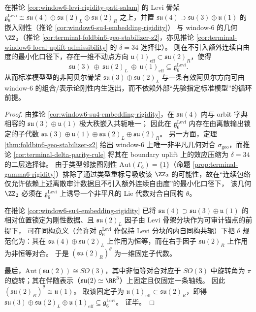 \begin{corollary}\label{cor:window6-levi-rigidity-sm-residual}
在推论 \ref{cor:window6-levi-rigidity-pati-salam} 的 Levi 骨架
\(
\mathfrak g^{\mathrm{Levi}}_6\cong \mathfrak{su}(4)\oplus\mathfrak{su}(2)_L\oplus\mathfrak{su}(2)_R
\)
之上，并置 \(\mathfrak{su}(4)\supset \mathfrak{su}(3)\oplus\mathfrak u(1)\) 的嵌入刚性（推论 \ref{cor:window6-su4-embedding-rigidity}）
与 window-\(6\) 的几何 \(\ZZ_2\)（推论 \ref{cor:terminal-foldbin6-geo-stabilizer-z2}，亦见推论 \ref{cor:terminal-window6-local-uplift-admissibility} 的 \(\delta=34\) 选择律）。
则在不引入额外连续自由度的最小化口径下，存在一维不动点方向 \(\mathfrak u(1)_{\mathrm{eff}}\subset \mathfrak{su}(2)_R\)，使得
\[
\mathfrak{su}(3)\ \oplus\ \mathfrak{su}(2)_L\ \oplus\ \mathfrak u(1)_{\mathrm{eff}}
\subseteq \mathfrak g^{\mathrm{Levi}}_6.
\]
从而标准模型型的非阿贝尔骨架 \(\mathfrak{su}(3)\oplus\mathfrak{su}(2)_L\) 与一条有效阿贝尔方向可由 window-\(6\) 的组合/表示论刚性内生选出，而不依赖外部“先验指定标准模型”的循环前提。
\end{corollary}
\begin{proof}
由推论 \ref{cor:window6-su4-embedding-rigidity}，在 \(\mathfrak{su}(4)\) 内与 orbit 字典相容的 \(\mathfrak{su}(3)\oplus\mathfrak u(1)\) 极大秩嵌入共轭唯一；
因此在 \(\mathfrak g^{\mathrm{Levi}}_6\) 内存在由离散输出锁定的子代数
\(
\mathfrak{su}(3)\oplus\mathfrak u(1)\oplus\mathfrak{su}(2)_L\oplus\mathfrak{su}(2)_R
\)。
另一方面，定理 \ref{thm:foldbin6-geo-stabilizer-z2} 给出 window-\(6\) 上唯一非平凡几何对合 \(\sigma_{\mathrm{geo}}\)，而推论 \ref{cor:terminal-delta-parity-rule} 将其在 boundary uplift 上的效应压缩为 \(\delta=34\) 的二层选择律。
由于类型邻接图刚性 \(\mathrm{Aut}(\Gamma_6)=\{1\}\)（命题 \ref{prop:terminal-gamma6-rigidity}）排除了通过类型重标号吸收该 \(\ZZ_2\) 的可能性，故在“连续包络仅允许依赖上述离散审计数据且不引入额外连续自由度”的最小化口径下，
该几何 \(\ZZ_2\) 必须在 \(\mathfrak g^{\mathrm{Levi}}_6\) 上诱导一个非平凡的 Lie 代数对合自同构 \(\theta\)。
\par
在推论 \ref{cor:window6-su4-embedding-rigidity} 已将 \(\mathfrak{su}(4)\supset \mathfrak{su}(3)\oplus\mathfrak u(1)\) 的相对位置锁定为刚性数据、且 \(\mathfrak{su}(2)_L\) 因子由 Levi 骨架分块作为可审计锚点的前提下，
可在同构意义（允许对 \(\mathfrak g^{\mathrm{Levi}}_6\) 作保持 Levi 分块的内自同构共轭）下把 \(\theta\) 规范化为：其在 \(\mathfrak{su}(4)\oplus\mathfrak{su}(2)_L\) 上作用为恒等，而在右手因子 \(\mathfrak{su}(2)_R\) 上作用为非恒等对合。
于是 \((\mathfrak{su}(2)_R)^{\theta}\) 为一维固定子代数。
\par
最后，\(\mathrm{Aut}(\mathfrak{su}(2))\cong SO(3)\)，其中非恒等对合对应于 \(SO(3)\) 中旋转角为 \(\pi\) 的旋转；其在伴随表示（\(\mathfrak{su}(2)\simeq\RR^3\)）上固定且仅固定一条轴线。
因此 \((\mathfrak{su}(2)_R)^{\theta}\cong \mathfrak u(1)\)。
取该固定子为 \(\mathfrak u(1)_{\mathrm{eff}}\subset \mathfrak{su}(2)_R\)，即得
\(
\mathfrak{su}(3)\oplus\mathfrak{su}(2)_L\oplus \mathfrak u(1)_{\mathrm{eff}}\subseteq \mathfrak g^{\mathrm{Levi}}_6
\)。
证毕。
\end{proof}

